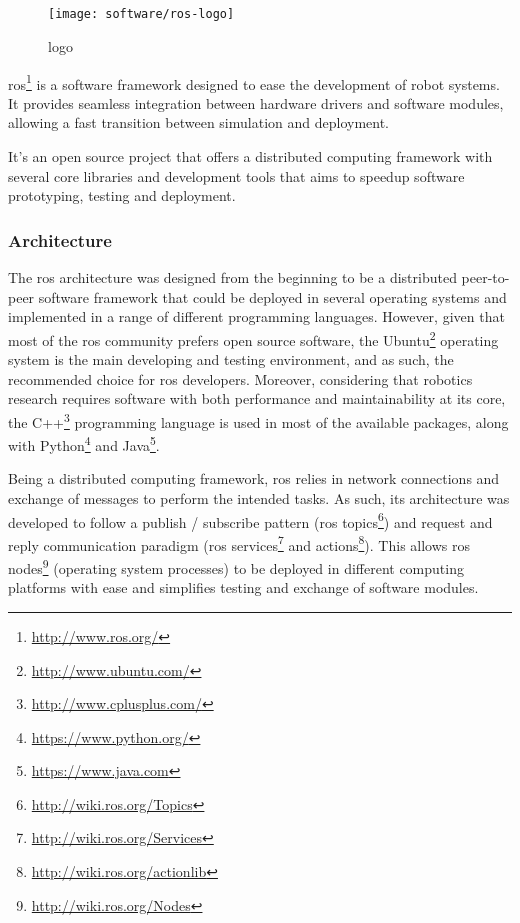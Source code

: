 \subsection{}

\begin{wrapfigure}{r}{0.23\textwidth}
	\centering
	\vspace*{-2em}
	\texttt{[image: software/ros-logo]}
	\caption{ logo}
	\label{fig:ros-logo}
\end{wrapfigure}

\gls{ros}\footnote{\url{http://www.ros.org/}} \cite{Quigley2009} is a software framework designed to ease the development of robot systems. It provides seamless integration between hardware drivers and software modules, allowing a fast transition between simulation and deployment.

It's an open source project that offers a distributed computing framework with several core libraries and development tools that aims to speedup software prototyping, testing and deployment.


\subsubsection{Architecture}

The \gls{ros} architecture was designed from the beginning to be a distributed peer-to-peer software framework that could be deployed in several operating systems and implemented in a range of different programming languages. However, given that most of the \gls{ros} community prefers open source software, the Ubuntu\footnote{\url{http://www.ubuntu.com/}} operating system is the main developing and testing environment, and as such, the recommended choice for \gls{ros} developers. Moreover, considering that robotics research requires software with both performance and maintainability at its core, the C++\footnote{\url{http://www.cplusplus.com/}} programming language is used in most of the available packages, along with Python\footnote{\url{https://www.python.org/}} and Java\footnote{\url{https://www.java.com}}.

Being a distributed computing framework, \gls{ros} relies in network connections and exchange of messages to perform the intended tasks. As such, its architecture was developed to follow a publish / subscribe pattern (\gls{ros} topics\footnote{\url{http://wiki.ros.org/Topics}}) and request and reply communication paradigm (\gls{ros} services\footnote{\url{http://wiki.ros.org/Services}} and actions\footnote{\url{http://wiki.ros.org/actionlib}}). This allows \gls{ros} nodes\footnote{\url{http://wiki.ros.org/Nodes}} (operating system processes) to be deployed in different computing platforms with ease and simplifies testing and exchange of software modules.

